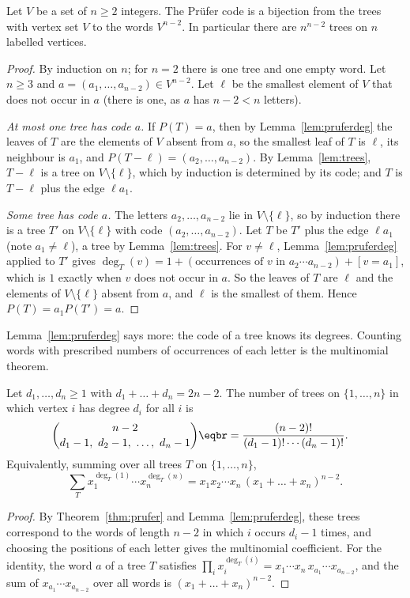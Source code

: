 \begin{theorem}\label{thm:prufer}
Let $V$ be a set of $n\ge2$ integers. The Pr\"ufer code is a bijection from the trees with vertex set $V$ to the words $V^{n-2}$.
In particular there are $n^{n-2}$ trees on $n$ labelled vertices.
\end{theorem}
\begin{proof}
By induction on $n$; for $n=2$ there is one tree and one empty word. Let $n\ge3$ and $a=(a_1,\dots,a_{n-2})\in V^{n-2}$. Let $\ell$ be the smallest
element of $V$ that does not occur in $a$ (there is one, as $a$ has $n-2<n$ letters).

\emph{At most one tree has code $a$.} If $P(T)=a$, then by Lemma~\ref{lem:pruferdeg} the leaves of $T$ are the elements of $V$ absent from $a$, so the
smallest leaf of $T$ is $\ell$, its neighbour is $a_1$, and $P(T-\ell)=(a_2,\dots,a_{n-2})$. By Lemma~\ref{lem:trees}, $T-\ell$ is a tree on
$V\setminus\{\ell\}$, which by induction is determined by its code; and $T$ is $T-\ell$ plus the edge $\ell a_1$.

\emph{Some tree has code $a$.} The letters $a_2,\dots,a_{n-2}$ lie in $V\setminus\{\ell\}$, so by induction there is a tree $T'$ on $V\setminus\{\ell\}$ with code
$(a_2,\dots,a_{n-2})$. Let $T$ be $T'$ plus the edge $\ell a_1$ (note $a_1\ne\ell$), a tree by Lemma~\ref{lem:trees}. For $v\ne\ell$, Lemma~\ref{lem:pruferdeg}
applied to $T'$ gives $\deg_T(v)=1+(\text{occurrences of }v\text{ in }a_2\cdots a_{n-2})+[v=a_1]$, which is $1$ exactly when $v$ does not occur in $a$. So
the leaves of $T$ are $\ell$ and the elements of $V\setminus\{\ell\}$ absent from $a$, and $\ell$ is the smallest of them. Hence $P(T)=a_1P(T')=a$.
\end{proof}

Lemma~\ref{lem:pruferdeg} says more: the code of a tree knows its degrees. Counting words with prescribed numbers of
occurrences of each letter is the multinomial theorem.

\begin{corollary}\label{cor:degrees}
Let $d_1,\dots,d_n\ge1$ with $d_1+\dots+d_n=2n-2$. The number of trees on $\{1,\dots,n\}$ in which vertex $i$ has degree $d_i$ for all $i$ is
\[
\begin{aligned}{}&\binom{n-2}{d_1-1,\ d_2-1,\ \dots,\ d_n-1}\eqbr=\frac{(n-2)!}{(d_1-1)!\cdots(d_n-1)!}.\end{aligned}
\]
Equivalently, summing over all trees $T$ on $\{1,\dots,n\}$,
\[
\sum_T x_1^{\deg_T(1)}\cdots x_n^{\deg_T(n)}=x_1x_2\cdots x_n\,(x_1+\dots+x_n)^{n-2}.
\]
\end{corollary}
\begin{proof}
By Theorem~\ref{thm:prufer} and Lemma~\ref{lem:pruferdeg}, these trees correspond to the words of length $n-2$ in which $i$ occurs $d_i-1$
times, and choosing the positions of each letter gives the multinomial coefficient. For the identity, the word $a$ of a tree
$T$ satisfies $\prod_ix_i^{\deg_T(i)}=x_1\cdots x_n\,x_{a_1}\cdots x_{a_{n-2}}$, and the sum of $x_{a_1}\cdots x_{a_{n-2}}$ over all words is $(x_1+\dots+x_n)^{n-2}$.
\end{proof}

